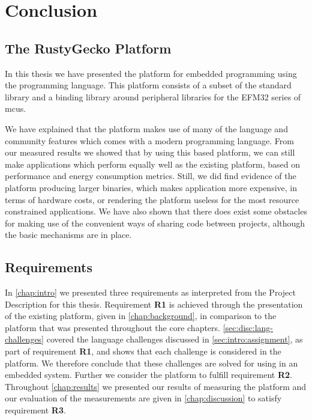 
\chapter{Conclusion}
\label{chap:conclusion}

\section{The RustyGecko Platform}

In this thesis we have presented the {\rg} platform for embedded programming using the {\rust} programming language.
This platform consists of a subset of the {\rust} standard library and a binding library around peripheral libraries for the EFM32 series of \glspl{mcu}.

We have explained that the platform makes use of many of the language and community features which comes with a modern programming language.
From our measured results we showed that by using this {\rust} based platform, we can still make applications which perform equally well as the existing {\C} platform, based on performance and energy consumption metrics.
Still, we did find evidence of the platform producing larger binaries, which makes {\rust} application more expensive, in terms of hardware costs, or rendering the platform useless for the most resource constrained applications.
We have also shown that there does exist some obstacles for making use of the convenient ways of sharing code between projects, although the basic mechanisms are in place.

\section{Requirements}

In \autoref{chap:intro} we presented three requirements as interpreted from the Project Description for this thesis.
Requirement \textbf{R1} is achieved through the presentation of the existing {\C} platform, given in \autoref{chap:background}, in comparison to the {\rust} platform that was presented throughout the core chapters.
\autoref{sec:disc:lang-challenges} covered the language challenges discussed in \autoref{sec:intro:assignment}, as part of requirement \textbf{R1}, and shows that each challenge is considered in the {\rg} platform.
We therefore conclude that these challenges are solved for using {\rust} in an embedded system.
Further we consider the {\rg} platform to fulfill requirement \textbf{R2}.
Throughout \autoref{chap:results} we presented our results of measuring the {\rg} platform and our evaluation of the measurements are given in \autoref{chap:discussion} to satisfy requirement \textbf{R3}.

